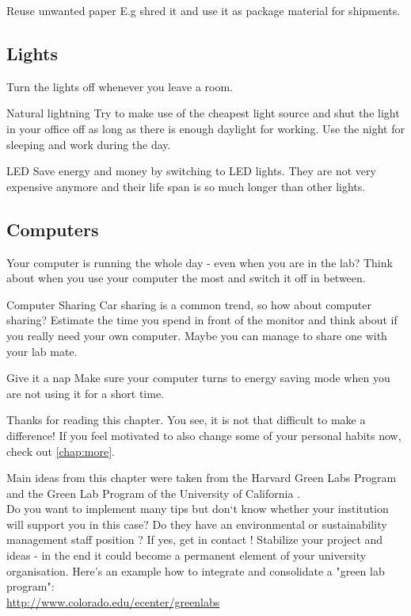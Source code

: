 \begin{suggest}{Reuse unwanted paper}
	E.g shred it and use it as package material for shipments. 
\end{suggest} 

\subsection{Lights}
	Turn the lights off whenever you leave a room. 
	
\begin{suggest}{Natural lightning}
	Try to make use of the cheapest light source and shut the light in your office off as long as there is enough daylight for working. Use the night for sleeping and work during the day.
\end{suggest} 

\begin{suggest}{LED}
		 Save energy and money by switching to LED lights. They are not very expensive anymore and their life span is so much longer than other lights.
\end{suggest}

\subsection{Computers}
	Your computer is running the whole day - even when you are in the lab? 
	Think about when you use your computer the most and switch it off in between.

\begin{suggest}{Computer Sharing}
	Car sharing is a common trend, so how about computer sharing? 
	Estimate the time you spend in front of the monitor and think about if you really need your own computer. Maybe you can manage to share one with your lab mate. 
\end{suggest}

\begin{suggest}{Give it a nap}
	Make sure your computer turns to energy saving mode when you are not using it for a short time. 
\end{suggest}

Thanks for reading this chapter. You see, it is not that difficult to make a difference! If you feel motivated to also change some of your personal habits now, check out \cref{chap:more}.

Main ideas from this chapter were taken from the Harvard Green Labs Program \cite{GreenHarvard} and the Green Lab Program of the University of California \cite{Greenlab}. \\

Do you want to implement many tips but don`t know whether your institution will support you in this case?
Do they have an environmental or sustainability management staff position ? If yes, get in contact ! Stabilize your project and ideas - in the end it could become a permanent element of your university organisation. 
Here's an example how to integrate and consolidate a "green lab program": \\ \url{http://www.colorado.edu/ecenter/greenlabs}
